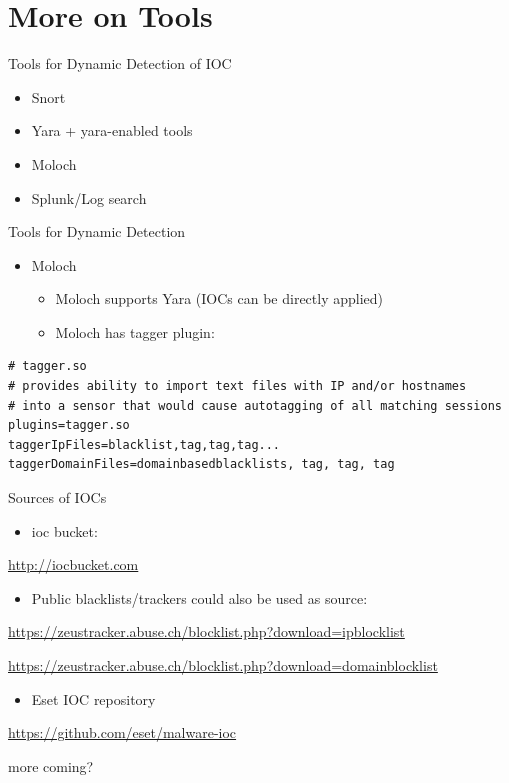 \documentclass[presentation,smaller]{beamer}
\begin{document}
\section{More on Tools}
\label{sec-7}
\begin{frame}[label=sec-7-1]{Tools for Dynamic Detection of IOC}
\begin{itemize}
\item Snort
\item Yara + yara-enabled tools
\item Moloch
\item Splunk/Log search
\end{itemize}
\end{frame}
\begin{frame}[fragile,label=sec-7-2]{Tools for Dynamic Detection}
 \begin{itemize}
\item Moloch
\begin{itemize}
\item Moloch supports Yara (IOCs can be directly applied)
\item Moloch has tagger plugin:
\end{itemize}
\end{itemize}
\lstset{language=sh,numbers=none}
\begin{lstlisting}
# tagger.so
# provides ability to import text files with IP and/or hostnames 
# into a sensor that would cause autotagging of all matching sessions
plugins=tagger.so
taggerIpFiles=blacklist,tag,tag,tag...
taggerDomainFiles=domainbasedblacklists, tag, tag, tag
\end{lstlisting}
\end{frame}
\begin{frame}[label=sec-7-3]{Sources of IOCs}
\begin{itemize}
\item ioc bucket:
\end{itemize}
\url{http://iocbucket.com}

\begin{itemize}
\item Public blacklists/trackers could also be used as source:
\end{itemize}

\url{https://zeustracker.abuse.ch/blocklist.php?download=ipblocklist}

\url{https://zeustracker.abuse.ch/blocklist.php?download=domainblocklist}

\begin{itemize}
\item Eset IOC repository
\end{itemize}
\url{https://github.com/eset/malware-ioc}

more coming?
\end{frame}
\end{document}

